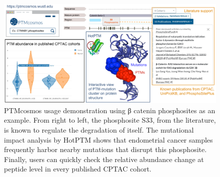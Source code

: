 \begin{figure}[tb]
    \centering
    \includegraphics[width=\linewidth]{figures/chap03_ptmcosmos/figure3_ptmcosmos_usage.pdf}
    \caption[PTMcosmos usage demonstration.]{%
        PTMcosmos usage demonstration using β catenin phosphosites as an example. From right to left, the phosphosite S33, from the literature, is known to regulate the degradation of itself. The mutational impact analysis by HotPTM shows that endometrial cancer samples frequently harbor nearby mutations that disrupt this phosphosite. Finally, users can quickly check the relative abundance change at peptide level in every published CPTAC cohort.
    }
    \label{fig:ptmcosmos-usage-demo}
\end{figure}


